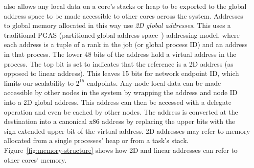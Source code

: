 \Grappa also allows any local data on a core's stacks or heap to be exported
to the global address space to be made accessible to other cores across the
system. Addresses to global memory allocated in this way use \emph{2D global
addresses}. This uses a traditional PGAS (partitioned global address
space~\cite{upc:2005}) addressing model, where each address is a tuple of a
rank in the job (or global process ID) and an address in that process. The
lower 48 bits of the address hold a virtual address in the process. The top
bit is set to indicates that the reference is a 2D address (as opposed to
linear address). This leaves 15 bits for network endpoint ID, which limits our
scalability to $2^{15}$ endpoints. Any node-local data can be made accessible
by other nodes in the system by wrapping the address and node ID into a 2D
global address. This address can then be accessed with a delegate operation
and even be cached by other nodes. The address is converted at the destination
into a canonical x86 address by replacing the upper bits with the
sign-extended upper bit of the virtual address. 2D addresses may refer to
memory allocated from a single processes' heap or from a task's stack.
Figure~\ref{fig:memory-structure} shows how 2D and linear addresses can refer
to other cores' memory.


